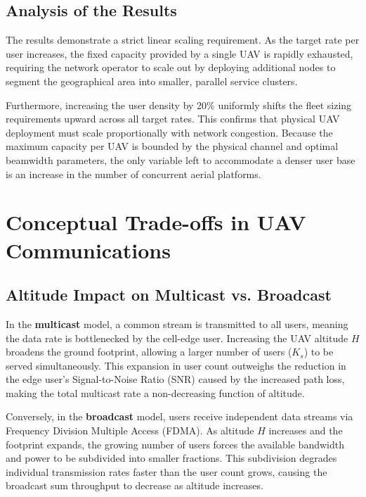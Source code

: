 \documentclass[11pt,a4paper]{article}
\begin{document}
    \subsection{Analysis of the Results}
    The results demonstrate a strict linear scaling requirement. As the target rate per user increases,
    the fixed capacity provided by a single UAV is rapidly exhausted, requiring the network operator to scale
    out by deploying additional nodes to segment the geographical area into smaller, parallel service clusters. 

    Furthermore, increasing the user density by 20\% uniformly shifts the fleet sizing requirements upward across
    all target rates. This confirms that physical UAV deployment must scale proportionally with network
    congestion. Because the maximum capacity per UAV is bounded by the physical channel and optimal beamwidth parameters,
    the only variable left to accommodate a denser user base is an increase in the number of concurrent aerial platforms.

\section{Conceptual Trade-offs in UAV Communications}

    \subsection{Altitude Impact on Multicast vs. Broadcast}
    In the \textbf{multicast} model, a common stream is transmitted to all users, meaning the data rate is bottlenecked by the cell-edge user.
    Increasing the UAV altitude $H$ broadens the ground footprint, allowing a larger number of users ($K_s$) to be served simultaneously.
    This expansion in user count outweighs the reduction in the edge user's Signal-to-Noise Ratio (SNR) caused by the increased path loss,
    making the total multicast rate a non-decreasing function of altitude.

    Conversely, in the \textbf{broadcast} model, users receive independent data streams via Frequency Division Multiple Access (FDMA).
    As altitude $H$ increases and the footprint expands, the growing number of users forces the available bandwidth and power to be
    subdivided into smaller fractions. This subdivision degrades individual transmission rates faster than the user count grows,
    causing the broadcast sum throughput to decrease as altitude increases.
\end{document}
